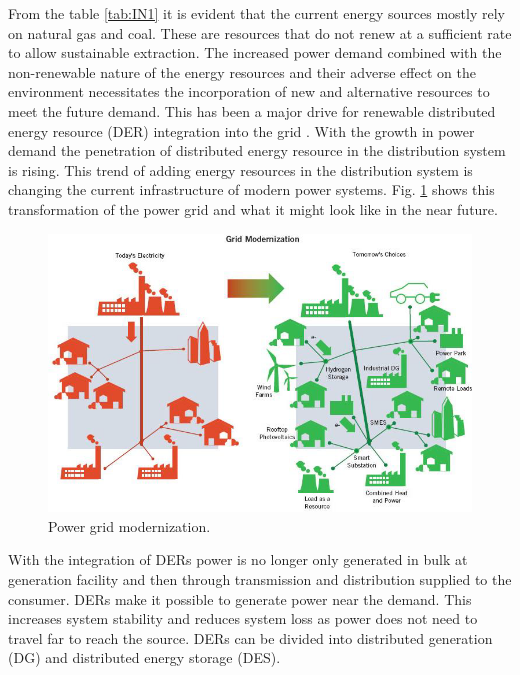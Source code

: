 From the table \ref{tab:IN1} it is evident that the current energy sources mostly rely on natural gas and coal. These are resources that do not renew at a sufficient rate to allow sustainable extraction. The increased power demand combined with the non-renewable nature of the energy resources and their adverse effect on the environment necessitates the incorporation of new and alternative resources to meet the future demand. This has been a major drive for renewable distributed energy resource (DER) integration into the grid \cite{khan2009review,bignucolo2008radial,series2009microgrids}. With the growth in power demand the penetration of distributed energy resource in the distribution system is rising. This trend of adding energy resources in the distribution system is changing the current infrastructure of modern power systems. Fig. \ref{fig:NEW_GRID} shows this transformation of the power grid and what it might look like in the near future. 

\begin{figure}[!h]
\centering
\includegraphics[width=0.85\linewidth]{figs/NEW_GRID.png}
\caption[Power grid modernization.]{Power grid modernization.\cite{NEW_GRID}}
\label{fig:NEW_GRID}
\end{figure}

With the integration of DERs power is no longer only generated in bulk at generation facility and then through transmission and distribution supplied to the consumer. DERs make it possible to generate power near the demand. This increases system stability and reduces system loss as power does not need to travel far to reach the source. DERs can be divided into distributed generation (DG) and distributed energy storage (DES). 

